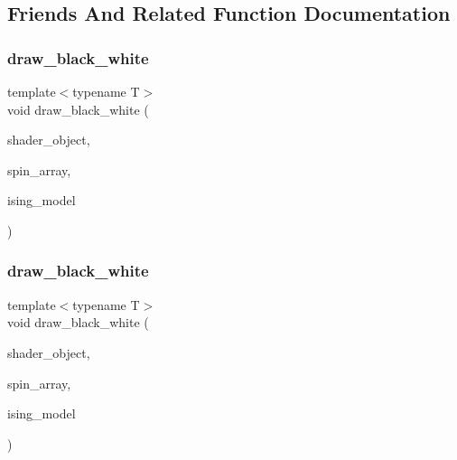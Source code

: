 \subsection{Friends And Related Function Documentation}
\mbox{\label{classSpinArray_a4b62e38a6e65366bfaf2c4a4172770ad}} 
\subsubsection{\texorpdfstring{draw\+\_\+black\+\_\+white}{draw\_black\_white}\hspace{0.1cm}{\footnotesize\ttfamily [1/3]}}
{\footnotesize\ttfamily template$<$typename T$>$ \\
void draw\+\_\+black\+\_\+white (\begin{DoxyParamCaption}\item[{\mbox{\hyperlink{classShader}{Shader}}$<$ \mbox{\hyperlink{shader__class_8hpp_a24e288e18eb7b6e01de7565001fedb60a72baef04098f035e8a320b03ad197818}{R\+E\+N\+D\+E\+R\+\_\+\+T\+Y\+P\+E\+::\+C\+U\+S\+T\+OM}} $>$ \&}]{shader\+\_\+object,  }\item[{\mbox{\hyperlink{classSpinArray}{Spin\+Array}}$<$ T $>$ \&}]{spin\+\_\+array,  }\item[{\mbox{\hyperlink{classIsingModel}{Ising\+Model}}$<$ T $>$ \&}]{ising\+\_\+model }\end{DoxyParamCaption})\hspace{0.3cm}{\ttfamily [friend]}}

\mbox{\label{classSpinArray_a4b62e38a6e65366bfaf2c4a4172770ad}} 
\subsubsection{\texorpdfstring{draw\+\_\+black\+\_\+white}{draw\_black\_white}\hspace{0.1cm}{\footnotesize\ttfamily [2/3]}}
{\footnotesize\ttfamily template$<$typename T$>$ \\
void draw\+\_\+black\+\_\+white (\begin{DoxyParamCaption}\item[{\mbox{\hyperlink{classShader}{Shader}}$<$ \mbox{\hyperlink{shader__class_8hpp_a24e288e18eb7b6e01de7565001fedb60a72baef04098f035e8a320b03ad197818}{R\+E\+N\+D\+E\+R\+\_\+\+T\+Y\+P\+E\+::\+C\+U\+S\+T\+OM}} $>$ \&}]{shader\+\_\+object,  }\item[{\mbox{\hyperlink{classSpinArray}{Spin\+Array}}$<$ T $>$ \&}]{spin\+\_\+array,  }\item[{\mbox{\hyperlink{classIsingModel}{Ising\+Model}}$<$ T $>$ \&}]{ising\+\_\+model }\end{DoxyParamCaption})\hspace{0.3cm}{\ttfamily [friend]}}


